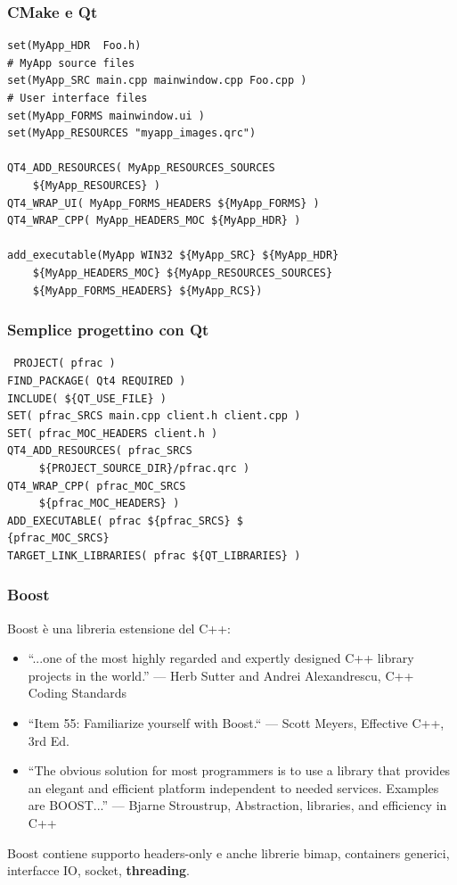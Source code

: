 \documentclass[10pt] {beamer}
\begin{document}

\begin{frame}[fragile]
 \frametitle{CMake e Qt}
\begin{footnotesize}
\begin{verbatim}
set(MyApp_HDR  Foo.h)
# MyApp source files
set(MyApp_SRC main.cpp mainwindow.cpp Foo.cpp )
# User interface files
set(MyApp_FORMS mainwindow.ui ) 
set(MyApp_RESOURCES "myapp_images.qrc")

QT4_ADD_RESOURCES( MyApp_RESOURCES_SOURCES 
    ${MyApp_RESOURCES} )
QT4_WRAP_UI( MyApp_FORMS_HEADERS ${MyApp_FORMS} )
QT4_WRAP_CPP( MyApp_HEADERS_MOC ${MyApp_HDR} )

add_executable(MyApp WIN32 ${MyApp_SRC} ${MyApp_HDR}
    ${MyApp_HEADERS_MOC} ${MyApp_RESOURCES_SOURCES}
    ${MyApp_FORMS_HEADERS} ${MyApp_RCS})
\end{verbatim}
\end{footnotesize}
\end{frame}

\begin{frame}[fragile]
 \frametitle{Semplice progettino con Qt}
\begin{verbatim}
 PROJECT( pfrac )
FIND_PACKAGE( Qt4 REQUIRED )
INCLUDE( ${QT_USE_FILE} )
SET( pfrac_SRCS main.cpp client.h client.cpp )
SET( pfrac_MOC_HEADERS client.h )
QT4_ADD_RESOURCES( pfrac_SRCS 
     ${PROJECT_SOURCE_DIR}/pfrac.qrc )
QT4_WRAP_CPP( pfrac_MOC_SRCS 
     ${pfrac_MOC_HEADERS} )
ADD_EXECUTABLE( pfrac ${pfrac_SRCS} $
{pfrac_MOC_SRCS} 
TARGET_LINK_LIBRARIES( pfrac ${QT_LIBRARIES} )
\end{verbatim}

\end{frame}


\begin{frame}[fragile]
\frametitle{Boost}
Boost è una libreria estensione del C++:
\begin{itemize}
\item ``...one of the most highly regarded and expertly designed C++ library projects in the world.''
— Herb Sutter and Andrei Alexandrescu, C++ Coding Standards
\item ``Item 55: Familiarize yourself with Boost.``
— Scott Meyers, Effective C++, 3rd Ed.
\item ``The obvious solution for most programmers is to use a library that provides an elegant and efficient platform independent to needed services. Examples are BOOST...''
— Bjarne Stroustrup, Abstraction, libraries, and efficiency in C++
\end{itemize}
Boost contiene supporto headers-only e anche librerie bimap, containers generici, interfacce IO, socket, \textbf{threading}.
\end{frame}
\end{document}
